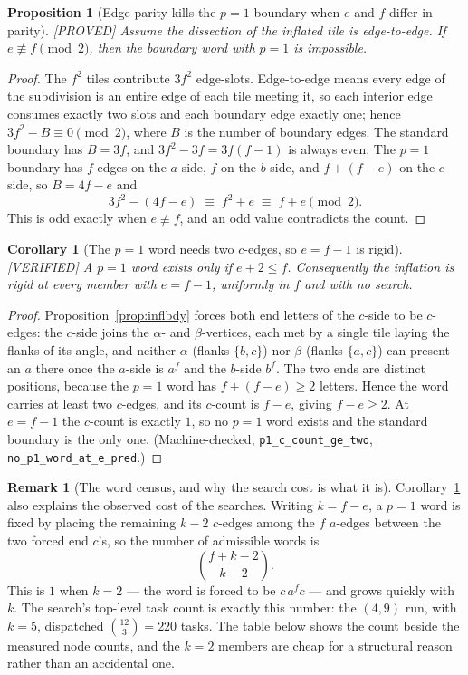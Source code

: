 \documentclass[11pt,reqno]{amsart}
\theoremstyle{plain}
\newtheorem{corollary}[theorem]{Corollary}
\newtheorem{proposition}[theorem]{Proposition}
\theoremstyle{definition}
\newtheorem{remark}[theorem]{Remark}
\newcommand{\lab}[1]{\hfill\textnormal{\footnotesize\textsc{[#1]}}}
\begin{document}
\begin{proposition}[Edge parity kills the $p=1$ boundary when $e$ and $f$ differ in parity]\label{prop:inflparity}\lab{PROVED}
Assume the dissection of the inflated tile is \emph{edge-to-edge}. If $e\not\equiv f \pmod 2$, then the
boundary word with $p=1$ is impossible.
\end{proposition}

\begin{proof}
The $f^2$ tiles contribute $3f^2$ edge-slots. Edge-to-edge means every edge of the subdivision is an
entire edge of each tile meeting it, so each interior edge consumes exactly two slots and each boundary
edge exactly one; hence $3f^2 - B \equiv 0 \pmod 2$, where $B$ is the number of boundary edges. The
standard boundary has $B=3f$, and $3f^2-3f=3f(f-1)$ is always even. The $p=1$ boundary has $f$ edges on
the $a$-side, $f$ on the $b$-side, and $f + (f-e)$ on the $c$-side, so $B=4f-e$ and
\[
  3f^2-(4f-e) \;\equiv\; f^2+e \;\equiv\; f+e \pmod 2 .
\]
This is odd exactly when $e\not\equiv f$, and an odd value contradicts the count.
\end{proof}

\begin{corollary}[The $p=1$ word needs two $c$-edges, so $e=f-1$ is rigid]\label{cor:twoc}\lab{VERIFIED}
A $p=1$ word exists only if $e+2\le f$. Consequently the inflation is rigid at every member with
$e=f-1$, uniformly in $f$ and with no search.
\end{corollary}

\begin{proof}
Proposition~\ref{prop:inflbdy} forces both end letters of the $c$-side to be $c$-edges: the $c$-side
joins the $\alpha$- and $\beta$-vertices, each met by a single tile laying the flanks of its angle, and
neither $\alpha$ (flanks $\{b,c\}$) nor $\beta$ (flanks $\{a,c\}$) can present an $a$ there once the
$a$-side is $a^f$ and the $b$-side $b^f$. The two ends are distinct positions, because the $p=1$ word has
$f+(f-e)\ge2$ letters. Hence the word carries at least two $c$-edges, and its $c$-count is $f-e$, giving
$f-e\ge2$. At $e=f-1$ the $c$-count is exactly $1$, so no $p=1$ word exists and the standard boundary is
the only one. \textup{(}Machine-checked, \texttt{p1\_c\_count\_ge\_two}, \texttt{no\_p1\_word\_at\_e\_pred}.\textup{)}
\end{proof}

\begin{remark}[The word census, and why the search cost is what it is]\label{rem:wordcensus}
Corollary~\ref{cor:twoc} also explains the observed cost of the searches. Writing $k=f-e$, a $p=1$ word
is fixed by placing the remaining $k-2$ $c$-edges among the $f$ $a$-edges between the two forced end
$c$'s, so the number of admissible words is
\[
  \binom{f+k-2}{\,k-2\,}.
\]
This is $1$ when $k=2$ --- the word is forced to be $c\,a^{f}c$ --- and grows quickly with $k$. The
search's top-level task count is exactly this number: the $(4,9)$ run, with $k=5$, dispatched
$\binom{12}{3}=220$ tasks. The table below shows the count beside the measured node counts, and the
$k=2$ members are cheap for a structural reason rather than an accidental one.
\end{remark}
\end{document}

